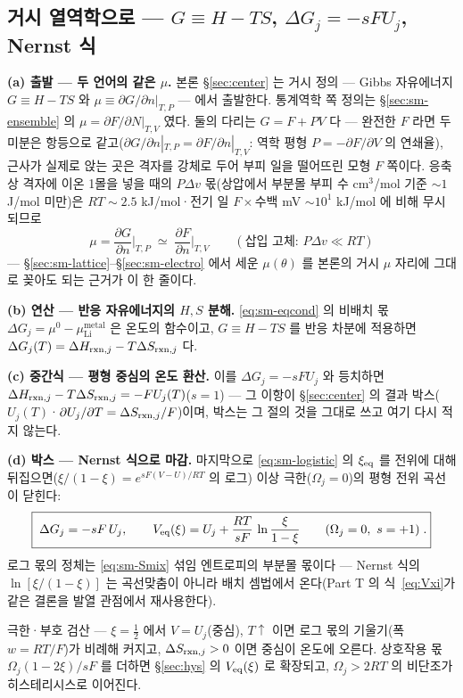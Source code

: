 \subsection{거시 열역학으로 --- $G\equiv H-TS$, $\Delta G_j=-sFU_j$, Nernst 식}\label{sec:sm-macro}
\textbf{(a) 출발 --- 두 언어의 같은 $\mu$.} 본론 \S\ref{sec:center} 는 거시 정의 --- Gibbs 자유에너지
$G\equiv H-TS$ 와 $\mu\equiv\partial G/\partial n|_{T,P}$ --- 에서 출발한다. 통계역학 쪽 정의는
\S\ref{sec:sm-ensemble} 의 $\mu=\partial F/\partial N|_{T,V}$ 였다. 둘의 다리는 $G=F+PV$ 다 --- 완전한
$F$ 라면 두 미분은 항등으로 같고($\partial G/\partial n|_{T,P}=\partial F/\partial n|_{T,V}$: 역학 평형
$P=-\partial F/\partial V$ 의 연쇄율), 근사가 실제로 앉는 곳은 격자를 강체로 두어 부피 일을 떨어뜨린 모형
$F$ 쪽이다. 응축상 격자에 이온 1몰을 넣을 때의 $P\Delta v$ 몫(상압에서 부분몰 부피 수 cm$^3$/mol 기준
$\sim1$ J/mol 미만)은 $RT\sim2.5$ kJ/mol·전기 일 $F\times$수백 mV $\sim10^1$ kJ/mol 에 비해 무시되므로
\begin{equation}
\mu=\frac{\partial G}{\partial n}\Big|_{T,P}\;\simeq\;\frac{\partial F}{\partial n}\Big|_{T,V}
\qquad(\text{삽입 고체: }P\Delta v\ll RT)
\label{eq:sm-mubridge}
\end{equation}
--- \S\ref{sec:sm-lattice}--\S\ref{sec:sm-electro} 에서 세운 $\mu(\theta)$ 를 본론의 거시 $\mu$ 자리에
그대로 꽂아도 되는 근거가 이 한 줄이다.

\textbf{(b) 연산 --- 반응 자유에너지의 $H,S$ 분해.} \eqref{eq:sm-eqcond} 의 비배치 몫
$\Delta G_j=\mu^0-\mu_\mathrm{Li}^\mathrm{metal}$ 은 온도의 함수이고, $G\equiv H-TS$ 를 반응 차분에 적용하면
$\Delta G_j(T)=\Delta H_{\mathrm{rxn},j}-T\Delta S_{\mathrm{rxn},j}$ 다.

\textbf{(c) 중간식 --- 평형 중심의 온도 환산.}
이를 $\Delta G_j=-sFU_j$ 와 등치하면 $\Delta H_{\mathrm{rxn},j}-T\Delta S_{\mathrm{rxn},j}=-FU_j(T)$($s{=}1$) --- 그 이항이
\S\ref{sec:center} 의 결과 박스($U_j(T)$·$\partial U_j/\partial T=\Delta S_{\mathrm{rxn},j}/F$)이며, 박스는 그 절의
것을 그대로 쓰고 여기 다시 적지 않는다.

\textbf{(d) 박스 --- Nernst 식으로 마감.} 마지막으로 \eqref{eq:sm-logistic} 의 $\xi_{\mathrm{eq}}$ 를 전위에 대해
뒤집으면($\xi/(1-\xi)=e^{sF(V-U)/RT}$ 의 로그) 이상 극한($\Omega_j=0$)의 평형 전위 곡선이 닫힌다:
\begin{equation}
\boxed{\;
\Delta G_j=-sF\,U_j,
\qquad
V_{\mathrm{eq}}(\xi)=U_j+\frac{RT}{sF}\,\ln\frac{\xi}{1-\xi}
\qquad(\Omega_j=0,\ s=+1)\;.}
\label{eq:sm-nernst}
\end{equation}
로그 몫의 정체는 \eqref{eq:sm-Smix} 섞임 엔트로피의 부분몰 몫이다 --- Nernst 식의 $\ln[\xi/(1-\xi)]$ 는
곡선맞춤이 아니라 배치 셈법에서 온다(Part T 의 식~\eqref{eq:Vxi}가 같은 결론을 발열 관점에서 재사용한다).
\begin{verifybox}
극한·부호 검산 --- $\xi=\tfrac12$ 에서 $V=U_j$(중심), $T\!\uparrow$ 이면 로그 몫의 기울기(폭 $w=RT/F$)가
비례해 커지고, $\Delta S_{\mathrm{rxn},j}>0$ 이면 중심이 온도에 오른다. 상호작용 몫 $\Omega_j(1-2\xi)/sF$ 를 더하면
\S\ref{sec:hys} 의 $V_{\mathrm{eq}}(\xi)$ 로 확장되고, $\Omega_j>2RT$ 의 비단조가 히스테리시스로 이어진다.
\end{verifybox}


